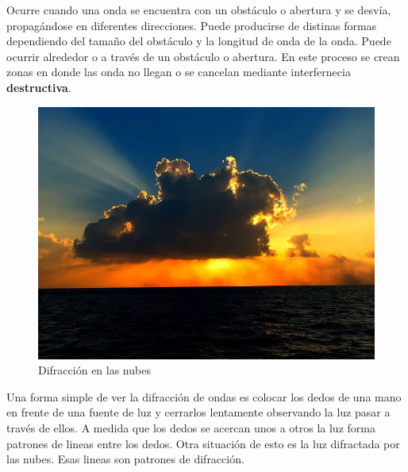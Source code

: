 Ocurre cuando una onda se encuentra con un obstáculo o abertura y se desvía, propagándose en diferentes direcciones. Puede producirse de distinas formas dependiendo del tamaño del obstáculo y la longitud de onda de la onda. Puede ocurrir alrededor o a través de un obstáculo o abertura. En este proceso se crean zonas en donde las onda no llegan o se cancelan mediante interfernecia \textbf{destructiva}.

\begin{figure}[H]
  \centering
  \includegraphics[scale=0.3]{imagenes/difraccion_nube.png}
  \caption{Difracción en las nubes\cite{rnbsymdfr}}
\end{figure}

Una forma simple de ver la difracción de ondas es colocar los dedos de una mano en frente de una fuente de luz y cerrarlos lentamente observando la luz pasar a través de ellos. A medida que los dedos se acercan unos a otros la luz forma patrones de lineas entre los dedos. Otra situación de esto es la luz difractada por las nubes. Esas lineas son patrones de difracción\cite{sncdfrlight}.
